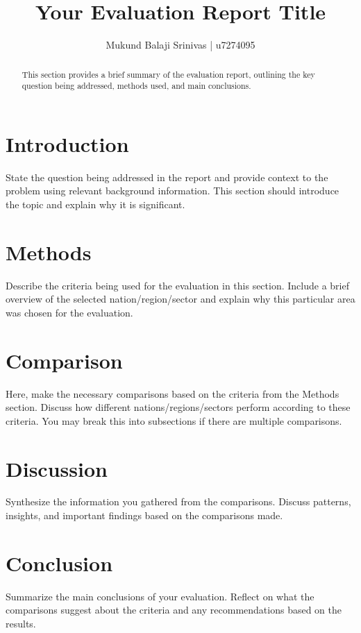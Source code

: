 \documentclass[12pt]{article}
\title{Your Evaluation Report Title}
\author{Mukund Balaji Srinivas | u7274095}
\begin{document}
\maketitle

\begin{abstract}
This section provides a brief summary of the evaluation report, outlining the key question being addressed, methods used, and main conclusions.
\end{abstract}

\newpage

\section*{Introduction}
State the question being addressed in the report and provide context to the problem using relevant background information. This section should introduce the topic and explain why it is significant.

\section*{Methods}
Describe the criteria being used for the evaluation in this section. Include a brief overview of the selected nation/region/sector and explain why this particular area was chosen for the evaluation.

\section*{Comparison}
Here, make the necessary comparisons based on the criteria from the Methods section. Discuss how different nations/regions/sectors perform according to these criteria. You may break this into subsections if there are multiple comparisons.

\section*{Discussion}
Synthesize the information you gathered from the comparisons. Discuss patterns, insights, and important findings based on the comparisons made.

\section*{Conclusion}
Summarize the main conclusions of your evaluation. Reflect on what the comparisons suggest about the criteria and any recommendations based on the results.

\newpage
% 
\end{document}
